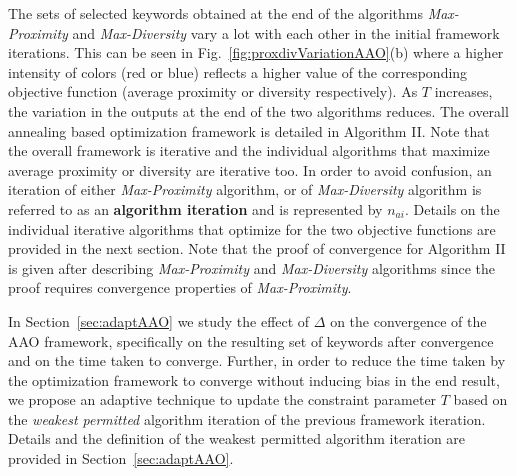 The sets of selected keywords obtained at the end of the algorithms \textit{Max-Proximity} and \textit{Max-Diversity} vary a lot with each other in the initial framework iterations. This can be seen in Fig.~\ref{fig:proxdivVariationAAO}(b) where a higher intensity of colors (red or blue) reflects a higher value of the corresponding objective function (average proximity or diversity respectively). As $T$ increases, the variation in the outputs at the end of the two algorithms reduces. The overall annealing based optimization framework is detailed in Algorithm II. Note that the overall framework is iterative and the individual algorithms that maximize average proximity or diversity are iterative too. In order to avoid confusion, an iteration of either \textit{Max-Proximity} algorithm, or of \textit{Max-Diversity} algorithm is referred to as an \textbf{algorithm iteration} and is represented by $n_{ai}$. Details on the individual iterative algorithms that optimize for the two objective functions are provided in the next section. Note that the proof of convergence for Algorithm II is given after describing \textit{Max-Proximity} and \textit{Max-Diversity} algorithms since the proof requires convergence properties of \textit{Max-Proximity}. 

In Section~\ref{sec:adaptAAO} we study the effect of $\Delta$ on the convergence of the AAO framework, specifically on the resulting set of keywords after convergence and on the time taken to converge. Further, in order to reduce the time taken by the optimization framework to converge without inducing bias in the end result, we propose an adaptive technique to update the constraint parameter $T$ based on the \textit{weakest permitted} algorithm iteration of the previous framework iteration. Details and the definition of the weakest permitted algorithm iteration are provided in Section~\ref{sec:adaptAAO}. 

